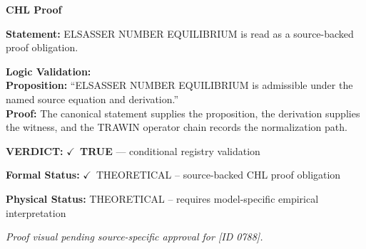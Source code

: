\vspace{0.45em}
\noindent\textbf{CHL Proof}\par
\textbf{Statement:} ELSASSER NUMBER EQUILIBRIUM is read as a source-backed proof obligation.

\textbf{Logic Validation:}\\
\textbf{Proposition:} ``ELSASSER NUMBER EQUILIBRIUM is admissible under the named source equation and derivation.''\\
\textbf{Proof:} The canonical statement supplies the proposition, the derivation supplies the witness, and the TRAWIN operator chain records the normalization path.

\textbf{VERDICT:} \ensuremath{\checkmark}\ \textbf{TRUE} --- conditional registry validation

\textbf{Formal Status:} \ensuremath{\checkmark}\ THEORETICAL -- source-backed CHL proof obligation

\textbf{Physical Status:} THEORETICAL -- requires model-specific empirical interpretation
\par\vspace{0.45em}
\par
\vfill
\begingroup\footnotesize\itshape
Proof visual pending source-specific approval for [ID 0788].
\par\endgroup
\vfill
\endgroup
\endgroup
